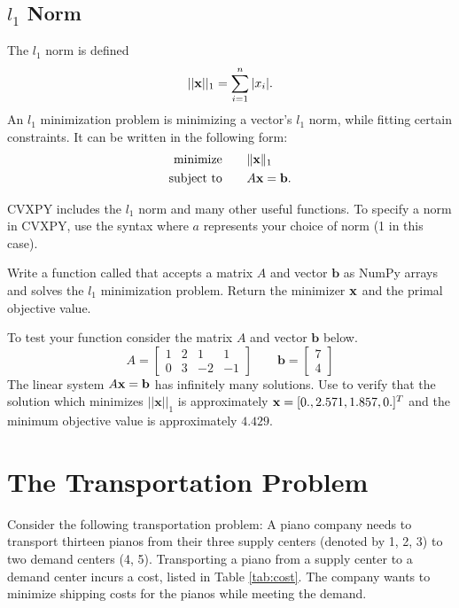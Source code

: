 \subsection*{$l_1$ Norm}
The $l_1$ norm is defined 
\[||\mathbf{x}||_1=\sum_{i=1}^n |x_i|.\]
An $l_1$ minimization problem is minimizing a vector's $l_1$ norm, while fitting certain constraints. It can be written in the following form:
\begin{align*}
\text{minimize}\qquad &\|\mathbf{x}\|_1\\
\text{subject to} \qquad &A\mathbf{x} = \mathbf{b}.
\end{align*}

CVXPY includes the $l_1$ norm and many other useful functions.
To specify a norm in CVXPY, use the syntax  where $a$ represents your choice of norm (1 in this case).

\begin{problem}
Write a function called  that accepts a matrix $A$ and vector $\mathbf{b}$ as NumPy arrays and solves the $l_1$ minimization problem.
Return the minimizer $\mathbf{x}$ and the primal objective value.

To test your function consider the matrix $A$ and vector $\mathbf{b}$ below.
\[
A = \begin{bmatrix}
1 & 2 & 1 & 1\\
0 & 3 & -2 & -1
\end{bmatrix} \qquad
\mathbf{b} = \begin{bmatrix}
7 \\
4
\end{bmatrix}
\]
The linear system $A\mathbf{x} = \mathbf{b}$ has infinitely many solutions.
Use  to verify that the solution which minimizes $||\mathbf{x}||_1$ is approximately $\mathbf{x} = [0., 2.571, 1.857, 0.]^T$ and the minimum objective value is approximately $4.429$.
\label{prob:l1}
\end{problem}

\section*{The Transportation Problem}

Consider the following transportation problem:
A piano company needs to transport thirteen pianos from their three  supply centers (denoted by 1, 2, 3) to two demand centers (4, 5).
Transporting a piano from a supply center to a demand center incurs a cost, listed in Table \ref{tab:cost}.
The company wants to minimize shipping costs for the pianos while meeting the demand.

